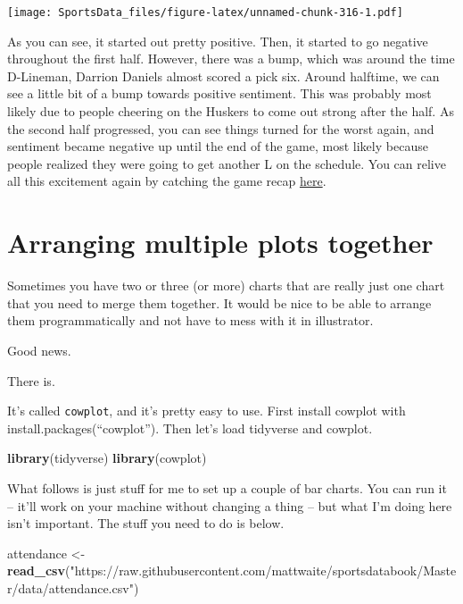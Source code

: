 \documentclass[]{book}
\newenvironment{Shaded}{\begin{snugshade}}{\end{snugshade}}
\newcommand{\KeywordTok}[1]{\textcolor[rgb]{0.13,0.29,0.53}{\textbf{#1}}}
\newcommand{\NormalTok}[1]{#1}
\newcommand{\StringTok}[1]{\textcolor[rgb]{0.31,0.60,0.02}{#1}}
\begin{document}
\texttt{[image: SportsData\_files/figure-latex/unnamed-chunk-316-1.pdf]}

As you can see, it started out pretty positive. Then, it started to go negative throughout the first half. However, there was a bump, which was around the time D-Lineman, Darrion Daniels almost scored a pick six. Around halftime, we can see a little bit of a bump towards positive sentiment. This was probably most likely due to people cheering on the Huskers to come out strong after the half. As the second half progressed, you can see things turned for the worst again, and sentiment became negative up until the end of the game, most likely because people realized they were going to get another L on the schedule. You can relive all this excitement again by catching the game recap \href{https://www.youtube.com/watch?v=m0hKH6Zb0vY\&feature=onebox}{here}.

\hypertarget{arranging-multiple-plots-together}{%
\chapter{Arranging multiple plots together}\label{arranging-multiple-plots-together}}

Sometimes you have two or three (or more) charts that are really just one chart that you need to merge them together. It would be nice to be able to arrange them programmatically and not have to mess with it in illustrator.

Good news.

There is.

It's called \texttt{cowplot}, and it's pretty easy to use. First install cowplot with install.packages(``cowplot''). Then let's load tidyverse and cowplot.

\begin{Shaded}
\begin{Highlighting}[]
\KeywordTok{library}\NormalTok{(tidyverse)}
\KeywordTok{library}\NormalTok{(cowplot)}
\end{Highlighting}
\end{Shaded}

What follows is just stuff for me to set up a couple of bar charts. You can run it -- it'll work on your machine without changing a thing -- but what I'm doing here isn't important. The stuff you need to do is below.

\begin{Shaded}
\begin{Highlighting}[]
\NormalTok{attendance <-}\StringTok{ }\KeywordTok{read_csv}\NormalTok{(}\StringTok{"https://raw.githubusercontent.com/mattwaite/sportsdatabook/Master/data/attendance.csv"}\NormalTok{)}
\end{Highlighting}
\end{Shaded}
\end{document}
